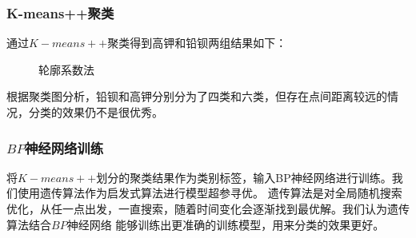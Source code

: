 \documentclass[UTF8]{ctexart}
\begin{document}
                \subsubsection{K-means++聚类}
                通过$K-means++$聚类得到高钾和铅钡两组结果如下：
                \begin{figure}[H]
                    \centering
                    \caption{轮廓系数法}
                    \label{fig}
                \end{figure}

                根据聚类图分析，铅钡和高钾分别分为了四类和六类，但存在点间距离较远的情况，分类的效果仍不是很优秀。

                \subsubsection{$BP$神经网络训练}

                将$K-means++$划分的聚类结果作为类别标签，输入BP神经网络进行训练。我们使用遗传算法作为启发式算法进行模型超参寻优。
                遗传算法是对全局随机搜索优化，从任一点出发，一直搜索，随着时间变化会逐渐找到最优解。我们认为遗传算法结合$BP$神经网络
                能够训练出更准确的训练模型，用来分类的效果更好。
\end{document}
